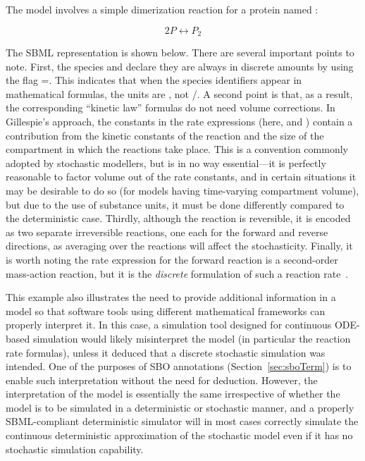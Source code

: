 The model involves a simple dimerization reaction for a protein
named :
\begin{linenomath}
\begin{equation*}
    2 P  \leftrightarrow  P_2
\end{equation*}
\end{linenomath}
The SBML representation is shown below.  There are several
important points to note.  First, the species  and 
declare they are always in discrete amounts by using the flag
=.  This indicates that
when the species identifiers appear in mathematical formulas, the
units are , not 
/.  A second point is that, as
a result, the corresponding ``kinetic law'' formulas do not need
volume corrections.  In Gillespie's approach, the constants in the
rate expressions (here,  and ) contain a
contribution from the kinetic constants of the reaction and the
size of the compartment in which the reactions take
place. This is a convention commonly adopted by stochastic
modellers, but is in no way essential---it is perfectly
reasonable to factor volume out of the rate constants, and in
certain situations it may be desirable to do so (\eg for models having
time-varying compartment volume), but due to the use of substance
units, it must be done differently compared to the deterministic case.
Thirdly, although the reaction is reversible, it is encoded as two
separate irreversible reactions, one each for the forward and
reverse directions, as averaging over the reactions will affect
the stochasticity.
Finally, it is worth noting the rate expression for the forward
reaction is a second-order mass-action reaction, but it is the
\emph{discrete} formulation of such a reaction
rate~\citep{gillespie:1977}.


This example also illustrates the need to provide additional
information in a model so that software tools using different
mathematical frameworks can properly interpret it.  In this case,
a simulation tool designed for continuous ODE-based simulation
would likely misinterpret the model (in particular the reaction
rate formulas), unless it deduced that a discrete stochastic
simulation was intended.  One of the purposes of SBO annotations
(Section~\ref{sec:sboTerm}) is to enable such interpretation
without the need for deduction. However, the interpretation of the
model is essentially the same irrespective of whether the model is
to be simulated in a deterministic or stochastic manner, and a
properly SBML-compliant deterministic simulator will in most cases
correctly simulate the continuous deterministic approximation
of the stochastic model even if it has no stochastic simulation
capability.

